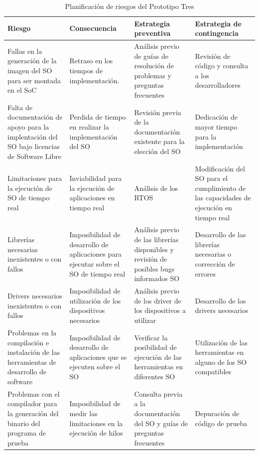 \newpage

 		\begin{table}[h!]
		\centering
		\begin{tabular}{ p{4cm} p{4cm} p{4cm} p{3cm} }
		\hline 
		\rowcolor[gray]{0.8} Riesgo & Consecuencia & Estrategia preventiva & Estrategia de contingencia\\
		\hline
		Fallas en la generación de la imagen del SO para ser montada en el SoC &Retraso en los tiempos de implementación.& Análisis previo de guías de resolución de problemas y preguntas frecuentes & Revisión de código y consulta a los desarrolladores\\		 
		\hline
		Falta de documentación de apoyo para la implentación del SO bajo licencias de Software Libre& Perdida de tiempo en realizar la implementación del SO & Revisión previa de la documentación existente para la elección del
SO & Dedicación de mayor tiempo para la implementación\\ 
		\hline
		 Limitaciones para la ejecución de SO de tiempo real & Inviabilidad para la ejecución
de aplicaciones en tiempo real & Análisis de los RTOS &Modificación del SO para el cumplimiento de las capacidades de ejecución en tiempo real\\
		\hline
		Librerías necesarias inexistentes o con fallos& Imposibilidad de desarrollo de aplicaciones para ejecutar sobre el SO de tiempo real& Análisis previo de las librerías disponibles y revisión de posibles bugs informados SO & Desarrollo de las librerías necesarias o corrección de errores\\			
		\hline
		Drivers necesarios inexistentes o con fallos & Imposibilidad de utilización
de los dispositivos necesarios&Análisis previo de los driver de los dispositivos a utilizar& Desarrollo de los drivers necesarios\\		
		\hline
		 Problemas en la compilación e instalación de las herramientas de desarrollo de software & Imposibilidad de desarrollo de aplicaciones que se ejecuten sobre el SO& Verificar la posibilidad de ejecución de las herramientas
en diferentes SO & Utilización de las herramientas en alguno de los SO compatibles\\
		\hline
		 Problemas con el compilador para la generación del binario del programa de prueba& Imposibilidad de medir las limitaciones en la ejecución de hilos & Consulta previa a la documentación del SO y guías de preguntas frecuentes & Depuración de código de prueba\\
		\hline
		\end{tabular}
		\caption{Planificación de riesgos del Prototipo Tres}
		\end{table}

